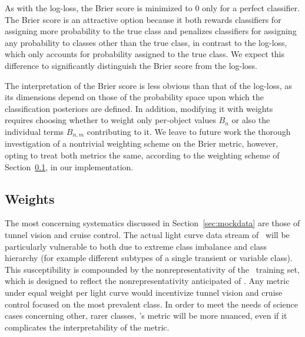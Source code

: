 As with the log-loss, the Brier score is minimized to $0$ only for a perfect classifier.
The Brier score is an attractive option because it both rewards classifiers for  assigning more probability to the true class and penalizes classifiers for assigning any probability to classes other than the true class, in contrast to the log-loss, which only accounts for probability assigned to the true class.
We expect this difference to significantly distinguish the Brier score from the log-loss.

The interpretation of the Brier score is less obvious than that of the log-loss, as its dimensions depend on those of the probability space upon which the classification posteriors are defined.
In addition, modifying it with weights requires choosing whether to weight only per-object values $B_{n}$ or also the individual terms $B_{n, m}$ contributing to it.
We leave to future work the thorough investigation of a nontrivial weighting scheme on the Brier metric, however, opting to treat both metrics the same, according to the weighting scheme of Section~\ref{sec:weights}, in our implementation.

\subsection{Weights}
\label{sec:weights}

The most concerning systematics discussed in Section~\ref{sec:mockdata} are those of tunnel vision and cruise control.
The actual light curve data stream of \lsst\ will be particularly vulnerable to both due to extreme class imbalance and class hierarchy (for example different subtypes of a single transient or variable class).
This susceptibility is compounded by the nonrepresentativity of the \plasticc\ training set, which is designed to reflect the nonrepresentativity anticipated of \lsst.
Any metric under equal weight per light curve would incentivize tunnel vision and cruise control focused on the most prevalent class.
In order to meet the needs of science cases concerning other, rarer classes, \plasticc's metric will be more nuanced, even if it complicates the interpretability of the metric.

